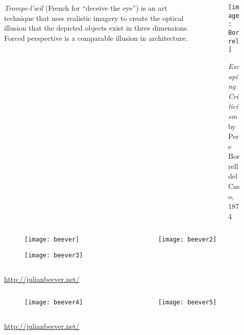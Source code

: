 \begin{frame}
\begin{columns}
\begin{column}{.5\textwidth}
\begin{block}{\textit{Trompe-l'œil} (French for ``deceive the eye'')}
{is an art technique that uses realistic imagery to create the optical illusion that the depicted objects exist in three dimensions. Forced perspective is a comparable illusion in architecture.}
\end{block}
\end{column}
\begin{column}{.5\textwidth}
\begin{figure}[!h]
\centering
\texttt{[image: Borrel]}
\caption{\textit{Escaping Criticism} by Pere Borrell del Caso, 1874}
\end{figure}
\end{column}
\end{columns}
\end{frame}

\begin{frame}
\begin{columns}
\begin{column}{.6\textwidth}
\begin{figure}[!h]
\centering
\texttt{[image: beever]}
\end{figure}
\begin{figure}[!h]
\centering
\texttt{[image: beever3]}
\end{figure}
\end{column}
\begin{column}{.4\textwidth}
\begin{figure}[!h]
\centering
\texttt{[image: beever2]}
\end{figure}
\end{column}
\end{columns}
\centering
\url{http://julianbeever.net/}
\end{frame}

\begin{frame}
\begin{columns}
\begin{column}{.5\textwidth}
\begin{figure}[!h]
\centering
\texttt{[image: beever4]}
\end{figure}
\end{column}
\begin{column}{.5\textwidth}
\begin{figure}[!h]
\centering
\texttt{[image: beever5]}
\end{figure}
\end{column}
\end{columns}
\url{http://julianbeever.net/}
\end{frame}

